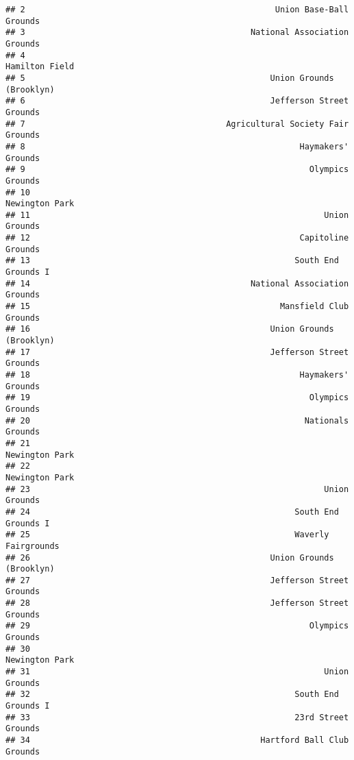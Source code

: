 \documentclass[]{article}
\begin{document}
\begin{verbatim}
## 2                                                   Union Base-Ball Grounds
## 3                                              National Association Grounds
## 4                                                            Hamilton Field
## 5                                                  Union Grounds (Brooklyn)
## 6                                                  Jefferson Street Grounds
## 7                                         Agricultural Society Fair Grounds
## 8                                                        Haymakers' Grounds
## 9                                                          Olympics Grounds
## 10                                                           Newington Park
## 11                                                            Union Grounds
## 12                                                       Capitoline Grounds
## 13                                                      South End Grounds I
## 14                                             National Association Grounds
## 15                                                   Mansfield Club Grounds
## 16                                                 Union Grounds (Brooklyn)
## 17                                                 Jefferson Street Grounds
## 18                                                       Haymakers' Grounds
## 19                                                         Olympics Grounds
## 20                                                        Nationals Grounds
## 21                                                           Newington Park
## 22                                                           Newington Park
## 23                                                            Union Grounds
## 24                                                      South End Grounds I
## 25                                                      Waverly Fairgrounds
## 26                                                 Union Grounds (Brooklyn)
## 27                                                 Jefferson Street Grounds
## 28                                                 Jefferson Street Grounds
## 29                                                         Olympics Grounds
## 30                                                           Newington Park
## 31                                                            Union Grounds
## 32                                                      South End Grounds I
## 33                                                      23rd Street Grounds
## 34                                               Hartford Ball Club Grounds

\end{verbatim}
\end{document}
